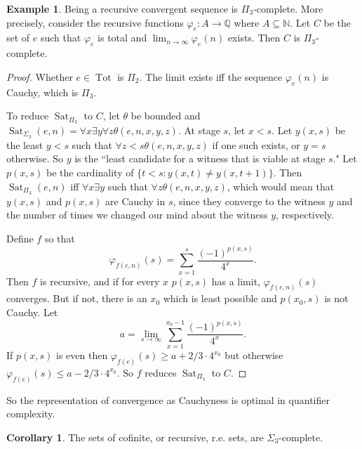 \documentclass[12pt]{report}
\newcommand{\NN}{\mathbb{N}}
\newcommand{\QQ}{\mathbb{Q}}
\DeclareMathOperator{\Sat}{Sat}
\DeclareMathOperator{\Tot}{Tot}
\theoremstyle{definition}
\newtheorem{corollary}[theorem]{Corollary}
\newtheorem{example}[theorem]{Example}
\begin{document}
\begin{example}
Being a recursive convergent sequence is $\Pi_3$-complete. More precisely, consider the recursive functions $\varphi_e: A \to \QQ$ where $A \subseteq \NN$. Let $C$ be the set of $e$ such that $\varphi_e$ is total and $\lim_{n \to \infty} \varphi_e(n)$ exists. Then $C$ is $\Pi_3$-complete.
\end{example}
\begin{proof}
Whether $e \in \Tot$ is $\Pi_2$. The limit exists iff the sequence $\varphi_e(n)$ is Cauchy, which is $\Pi_3$.

To reduce $\Sat_{\Pi_3}$ to $C$, let $\theta$ be bounded and $\Sat_{\Sigma_3}(e, n) = \forall x \exists y \forall z \theta(e,n,x,y,z)$.
At stage $s$, let $x < s$. Let $y(x, s)$ be the least $y < s$ such that $\forall z < s\theta(e, n, x, y, z)$ if one such exists, or $y = s$ otherwise. So $y$ is the ``least candidate for a witness that is viable at stage $s$."
Let $p(x, s)$ be the cardinality of $\{t < s: y(x, t) \neq y(x, t + 1)\}$. Then $\Sat_{\Pi_3}(e, n)$ iff  $\forall x \exists y$ such that $\forall z \theta(e, n, x, y, z)$, which would mean that $y(x, s)$ and $p(x, s)$ are Cauchy in $s$, since they converge to the witness $y$ and the number of times we changed our mind about the witness $y$, respectively.

Define $f$ so that
$$\varphi_{f(e, n)}(s) = \sum_{x=1}^s \frac{(-1)^{p(x, s)}}{4^x}.$$
Then $f$ is recursive, and if for every $x$ $p(x, s)$ has a limit, $\varphi_{f(e, n)}(s)$ converges.
But if not, there is an $x_0$ which is least possible and $p(x_0, s)$ is not Cauchy. Let
$$a = \lim_{s \to \infty} \sum_{x = 1}^{x_0 - 1} \frac{(-1)^{p(x, s)}}{4^x}.$$
If $p(x, s)$ is even then $\varphi_{f(e)}(s) \geq a + 2/3\cdot 4^{x_0}$ but otherwise $\varphi_{f(e)}(s) \leq a - 2/3\cdot 4^{x_0}$.
So $f$ reduces $\Sat_{\Pi_3}$ to $C$.
\end{proof}
So the representation of convergence as Cauchyness is optimal in quantifier complexity.

\begin{corollary}
The sets of cofinite, or recursive, r.e. sets, are $\Sigma_3$-complete.
\end{corollary}
\end{document}
